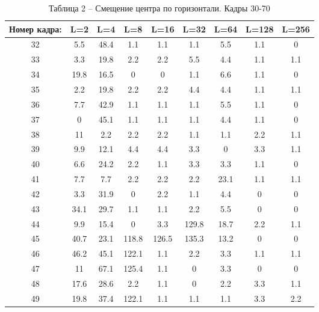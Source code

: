\begin{table}[h!]
\caption*{Таблица 2 -- Смещение центра по горизонтали. Кадры 30-70}
\begin{tabular}{|c|c|c|c|c|c|c|c|c|}
\hline
Номер кадра: & L=2   & L=4   & L=8   & L=16  & L=32  & L=64 & L=128 & L=256 \\ \hline
32           & 5.5   & 48.4  & 1.1   & 1.1   & 1.1   & 5.5  & 1.1   & 0     \\ \hline
33           & 3.3   & 19.8  & 2.2   & 2.2   & 5.5   & 4.4  & 1.1   & 1.1   \\ \hline
34           & 19.8  & 16.5  & 0     & 0     & 1.1   & 6.6  & 1.1   & 0     \\ \hline
35           & 2.2   & 19.8  & 2.2   & 2.2   & 4.4   & 4.4  & 1.1   & 1.1   \\ \hline
36           & 7.7   & 42.9  & 1.1   & 1.1   & 1.1   & 5.5  & 1.1   & 0     \\ \hline
37           & 0     & 45.1  & 1.1   & 1.1   & 1.1   & 4.4  & 1.1   & 0     \\ \hline
38           & 11    & 2.2   & 2.2   & 2.2   & 1.1   & 1.1  & 2.2   & 1.1   \\ \hline
39           & 9.9   & 12.1  & 4.4   & 4.4   & 3.3   & 0    & 3.3   & 1.1   \\ \hline
40           & 6.6   & 24.2  & 2.2   & 1.1   & 3.3   & 3.3  & 1.1   & 0     \\ \hline
41           & 7.7   & 7.7   & 2.2   & 2.2   & 2.2   & 23.1 & 1.1   & 1.1   \\ \hline
42           & 3.3   & 31.9  & 0     & 2.2   & 1.1   & 4.4  & 0     & 0     \\ \hline
43           & 34.1  & 29.7  & 1.1   & 1.1   & 2.2   & 5.5  & 0     & 0     \\ \hline
44           & 9.9   & 15.4  & 0     & 3.3   & 129.8 & 18.7 & 2.2   & 1.1   \\ \hline
45           & 40.7  & 23.1  & 118.8 & 126.5 & 135.3 & 13.2 & 0     & 0     \\ \hline
46           & 46.2  & 45.1  & 122.1 & 1.1   & 2.2   & 3.3  & 1.1   & 1.1   \\ \hline
47           & 11    & 67.1  & 125.4 & 1.1   & 0     & 3.3  & 0     & 0     \\ \hline
48           & 17.6  & 28.6  & 2.2   & 1.1   & 0     & 2.2  & 3.3   & 1.1   \\ \hline
49           & 19.8  & 37.4  & 122.1 & 1.1   & 1.1   & 1.1  & 3.3   & 2.2   \\ \hline

\end{tabular}
\end{table}

